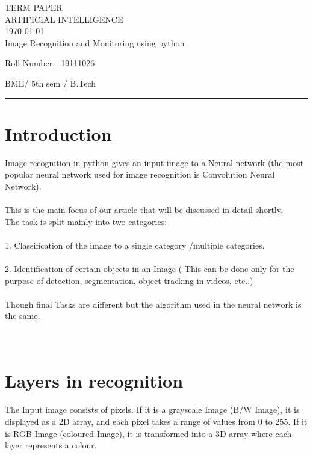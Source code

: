 \documentclass[12pt,letterpaper, onecolumn]{exam}
\begin{document}
\begingroup  
    \centering
    \LARGE TERM PAPER\\
    \LARGE ARTIFICIAL INTELLIGENCE\\[0.5em]
    \large \today\\[0.5em]
    \large Image Recognition and Monitoring using python\par
    \large Roll Number - 19111026\par
    \large BME/ 5th sem / B.Tech\par
\endgroup
\rule{\textwidth}{0.4pt}
\pointsdroppedatright   %
\printanswers
\renewcommand{\solutiontitle}{\noindent\textbf{Ans:}\enspace}   %


    \section{Introduction}
    Image recognition in python gives an input image to a Neural network (the most popular neural network used for image recognition is Convolution Neural Network). \\\\
  This is the main focus of our article that will be discussed in detail shortly.\\
  The task is split mainly into two categories:
\\\\
  1. Classification of the image to a single category /multiple categories.
\\\\
  2. Identification of certain objects in an Image ( This can be done only for the purpose of detection, segmentation, object tracking in videos, etc..)
  \\\\
  Though final Tasks are different but the algorithm used in the neural network is the same.
  \\\\\\

    \section{Layers in recognition}
    The Input image consists of pixels. If it is a grayscale Image (B/W Image), it is displayed as a 2D array, and each pixel takes a range of values from 0 to 255. If it is RGB       Image (coloured Image), it is transformed into a 3D array where each layer represents a colour.\\\\\\
    
\end{document}
